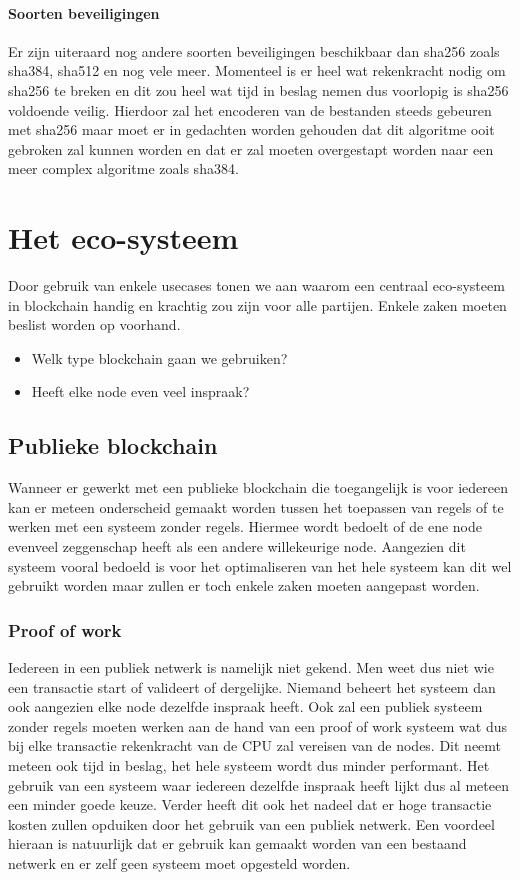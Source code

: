 \subsubsection{Soorten beveiligingen}
Er zijn uiteraard nog andere soorten beveiligingen beschikbaar dan sha256 zoals sha384, sha512 en nog vele meer. Momenteel is er heel wat rekenkracht nodig om sha256 te breken en dit zou heel wat tijd in beslag nemen dus voorlopig is sha256 voldoende veilig. Hierdoor zal het encoderen van de bestanden steeds gebeuren met sha256 maar moet er in gedachten worden gehouden dat dit algoritme ooit gebroken zal kunnen worden en dat er zal moeten overgestapt worden naar een meer complex algoritme zoals sha384. 

\chapter{Het eco-systeem}
\label{ch:eco-system}
Door gebruik van enkele usecases tonen we aan waarom een centraal eco-systeem in blockchain handig en krachtig zou zijn voor alle partijen. Enkele zaken moeten beslist worden op voorhand. 

\begin{itemize}
	\item Welk type blockchain gaan we gebruiken?
	\item Heeft elke node even veel inspraak?
\end{itemize}

\section{Publieke blockchain}
Wanneer er  gewerkt met een publieke blockchain die toegangelijk is voor iedereen kan er meteen onderscheid gemaakt worden tussen het toepassen van regels of te werken met een systeem zonder regels. Hiermee wordt bedoelt of de ene node evenveel zeggenschap heeft als een andere willekeurige node. Aangezien dit systeem vooral bedoeld is voor het optimaliseren van het hele systeem kan dit wel gebruikt worden maar zullen er toch enkele zaken moeten aangepast worden.

\subsection{Proof of work}
Iedereen in een publiek netwerk is namelijk niet gekend. Men weet dus niet wie een transactie start of valideert of dergelijke. Niemand beheert het systeem dan ook aangezien elke node dezelfde inspraak heeft. Ook zal een publiek systeem zonder regels moeten werken aan de hand van een proof of work systeem wat dus bij elke transactie rekenkracht van de CPU zal vereisen van de nodes. Dit neemt meteen ook tijd in beslag, het hele systeem wordt dus minder performant. Het gebruik van een systeem waar iedereen dezelfde inspraak heeft lijkt dus al meteen een minder goede keuze. Verder heeft dit ook het nadeel dat er hoge transactie kosten zullen opduiken door het gebruik van een publiek netwerk. Een voordeel hieraan is natuurlijk dat er gebruik kan gemaakt worden van een bestaand netwerk en er zelf geen systeem moet opgesteld worden. 

